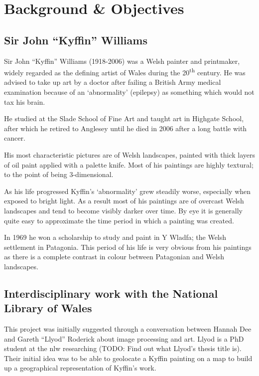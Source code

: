 \chapter{Background \& Objectives}


\section{Sir John ``Kyffin'' Williams}

Sir John ``Kyffin'' Williams (1918-2006) was a Welsh painter and printmaker, widely regarded as 
the defining artist of Wales during the 20\textsuperscript{th} century\cite{Davies2008Welsh}. He was advised to take up
art by a doctor after failing a British Army medical examination because of an `abnormality' 
(epilepsy) as something which would not tax his brain.

He studied at the Slade School of Fine Art and taught art in Highgate School, after which he 
retired to Anglesey until he died in 2006 after a long battle with cancer.

His most characteristic pictures are of Welsh landscapes, painted with thick layers of oil paint
applied with a palette knife\cite{Chilvers2009Dictionary}. Most of his paintings are highly textural; to the point of being
3-dimensional.

As his life progressed Kyffin's `abnormality' grew steadily worse, especially when exposed to 
bright light. As a result most of his paintings are of overcast Welsh landscapes and tend to 
become visibly darker over time\cite{Harris2011How}. By eye it is generally quite easy to approximate the time period
in which a painting was created.

In 1969 he won a scholarship to study and paint in Y Wladfa; the Welsh settlement in Patagonia.
This period of his life is very obvious from his paintings as there is a complete contrast in 
colour between Patagonian and Welsh landscapes.


\section{Interdisciplinary work with the National Library of Wales}

This project was initially suggested through a conversation between Hannah Dee and Gareth ``Llyod''
Roderick about image processing and art. Llyod is a PhD student at the \gls{nlw} researching 
(TODO: Find out what Llyod's thesis title is). Their initial idea was to be able
to geolocate a Kyffin painting on a map to build up a geographical representation of Kyffin's 
work.


